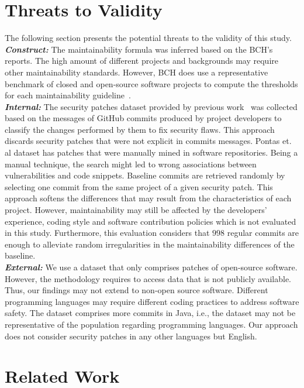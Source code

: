 \documentclass[10pt,conference]{IEEEtran}
\begin{document}
\section{Threats to Validity}\label{sec:threats}
%
The following section presents the potential threats to the validity of this
study.
%
\\\textit{\textbf{Construct:}} The maintainability formula was inferred based 
on the BCH's reports. The high amount of different projects and backgrounds 
may require other maintainability standards. However, BCH does use a 
representative benchmark of closed and open-source software projects to compute 
the thresholds for each maintainability guideline~\cite{Visser:2016:OREILLY, Baggen2012}.
%
\\\textit{\textbf{Internal:}} The security patches dataset provided by previous
work~\cite{Reis:2017:IJSSE} was collected based on the messages of GitHub
commits produced by project developers to classify the changes performed by them
to fix security flaws. This approach discards security patches that were
not explicit in commits messages. Pontas et. al\cite{10.1109/MSR.2019.00064} dataset
has patches that were manually mined in software repositories. Being a manual technique,
the search might led to
wrong associations between vulnerabilities and code snippets.
Baseline commits are retrieved randomly by selecting one commit from the same
project of a given security patch. This approach softens the differences
that may result from the characteristics of each project. However,
maintainability may still be affected by the developers' experience, coding
style and software contribution policies which is not evaluated in this study.
Furthermore, this evaluation considers that $998$ regular commits are enough to
alleviate random irregularities in the maintainability differences of the
baseline.
%
\\\textit{\textbf{External:}} We use a dataset that only comprises patches of open-source software.
However, the methodology requires to access data that is not publicly available.
Thus, our findings may not extend to non-open source software. Different programming 
languages may require different coding practices to address software safety. The 
dataset comprises more commits in Java, i.e., the dataset may not be representative 
of the population regarding programming languages. Our approach does not consider 
security patches in any other languages but English.

\section{Related Work}\label{sec:rw}
\end{document}
